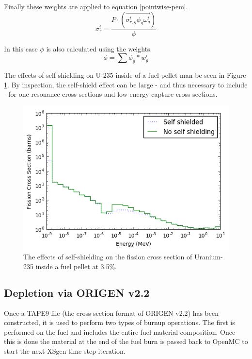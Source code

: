 \documentclass{article}
\begin{document}
Finally these weights are applied to equation \ref{pointwise-pem}.
\begin{equation}
\label{ssww}
\sigma_{r}^i=\frac{P \cdot (\overrightarrow{\sigma_{r,g}^i \phi_g \omega_g^i})}{\phi}
\end{equation}

In this case $\phi$ is also calculated using the weights. 
\begin{equation}
\label{phiw}
\phi=\sum\phi_g * w_g^i
\end{equation}

The effects of self shielding on U-235 inside of a fuel pellet man be seen in
Figure \ref{fig:index}. By inspection, the self-shield effect can be large - and thus
necessary to include - for one resonance cross sections and low energy capture cross sections.
\begin{figure}[h]
  \center
  \includegraphics[scale=0.6]{index.png}
  \caption{The effects of self-shielding on the fission cross section of Uranium-235 inside a fuel pellet at 3.5\%.}
  \label{fig:index}
\end{figure}

\subsection{Depletion via ORIGEN v2.2}
\label{sec:origen}
Once a TAPE9 file (the cross section format of ORIGEN v2.2) has been constructed, it is
used to perform two types of burnup operations. The first is performed on the fuel and
includes the entire fuel material composition. Once this is done the material at the
end of the fuel burn is passed back to OpenMC to start the next XSgen time step iteration.
\end{document}
